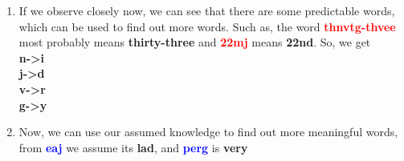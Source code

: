 \documentclass[12pt]{report}
\begin{document}
{\begin{enumerate}
{\begin{minipage}{0.8\textwidth}
\begin{small}
\hspace{0pt} anvthjag-yavtnes \hspace{0pt} dowsovtaaeg \hspace{0pt} tonethev. \hspace{0pt} at \hspace{0pt} that \hspace{0pt} tnwe \hspace{0pt} svojo \hspace{0pt} tas \hspace{0pt} stnee \hspace{0pt} nm \hspace{0pt} hns \hspace{0pt} tteems, \hspace{0pt} as \hspace{0pt} the \hspace{0pt} hoaants \hspace{0pt} daeeej \hspace{0pt} the \hspace{0pt} nvvesyomsnaee \hspace{0pt} ttemtnes \hspace{0pt} aetteem \hspace{0pt} dhnejhooj \hspace{0pt} amj \hspace{0pt} downmn \hspace{0pt} os \hspace{0pt} \textcolor{green}{\textbf{ane}} \hspace{0pt} at \hspace{0pt} \textcolor{red}{\textbf{thnvtg-thvee}}
\end{small}
\end{minipage}
}
\item{%
If we observe closely now, we can see that there are some predictable words, which can be used to find out more words. Such as, the word \textcolor{red}{\textbf{thnvtg-thvee}} most probably means \textbf{thirty-three} and \textcolor{red}{\textbf{22mj}} means \textbf{22nd}.
\newpage
So, we get\\
\textbf{n->i}\\
\textbf{j->d}\\
\textbf{v->r}\\
\textbf{g->y}\\}
\item{%
Now, we can use our assumed knowledge to find out more meaningful words, from \textcolor{blue}{\textbf{eaj}} we assume its \textbf{lad}, and \textcolor{blue}{\textbf{perg}} is \textbf{very}}

\end{enumerate}}
\end{document}
